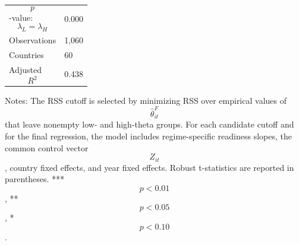 \begin{table}[H]
\begin{threeparttable}
\begin{tabularx}{\textwidth}{lY}
$$p$$-value: $$\lambda_L=\lambda_H$$ & 0.000 \\
Observations & 1,060 \\
Countries & 60 \\
Adjusted $$R^2$$ & 0.438 \\
\bottomrule
\end{tabularx}
\begin{tablenotes}[flushleft]\footnotesize
\item Notes: The RSS cutoff is selected by minimizing RSS over empirical values of $$\widehat{\theta}^{F}_{it}$$ that leave nonempty low- and high-theta groups. For each candidate cutoff and for the final regression, the model includes regime-specific readiness slopes, the common control vector $$Z_{it}$$, country fixed effects, and year fixed effects. Robust t-statistics are reported in parentheses. *** $$p<0.01$$, ** $$p<0.05$$, * $$p<0.10$$.
\end{tablenotes}
\end{threeparttable}
\end{table}
